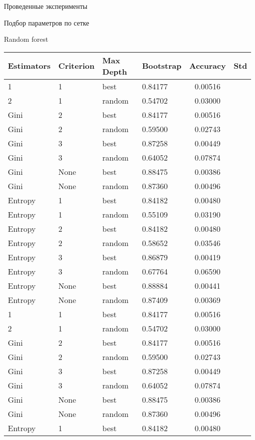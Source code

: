 \begin{section}{Проведенные эксперименты}
\begin{subsection}{Подбор параметров по сетке}
\begin{subsubsection}{Random forest}
  \begin{table}[H]
  \centering
  {\begin{tabular}{|l|l|l|l|c|c|}
  \hline
  \textbf{Estimators} & \textbf{Criterion} & \textbf{Max Depth} & \textbf{Bootstrap} & \textbf{Accuracy} & \textbf{Std} \\
  \hline
  1 & 1  & best & 0.84177 & 0.00516 \\
  \hline
  2 & 1  & random &  0.54702 & 0.03000 \\
  \hline
  Gini & 2  & best & 0.84177 & 0.00516 \\
  \hline
  Gini &  2 & random  & 0.59500 & 0.02743 \\
  \hline
  Gini & 3  & best & 0.87258 & 0.00449 \\
  \hline
  Gini & 3  & random & 0.64052 & 0.07874 \\
  \hline
  Gini & None  & best & 0.88475 & 0.00386 \\
  \hline
  Gini &  None & random  & 0.87360 & 0.00496 \\
  \hline
  Entropy & 1  & best & 0.84182 & 0.00480 \\
  \hline
  Entropy & 1  & random & 0.55109 & 0.03190 \\
  \hline
  Entropy  & 2  & best & 0.84182 & 0.00480 \\
  \hline
  Entropy  &  2 & random  & 0.58652 & 0.03546 \\
  \hline
  Entropy  & 3  & best &  0.86879 & 0.00419 \\
  \hline
  Entropy  & 3  & random & 0.67764 & 0.06590 \\
  \hline
  Entropy & None  & best & 0.88884 & 0.00441 \\
  \hline
  Entropy &  None & random  & 0.87409 & 0.00369 \\
  \hline
    1 & 1  & best & 0.84177 & 0.00516 \\
  \hline
  2 & 1  & random &  0.54702 & 0.03000 \\
  \hline
  Gini & 2  & best & 0.84177 & 0.00516 \\
  \hline
  Gini &  2 & random  & 0.59500 & 0.02743 \\
  \hline
  Gini & 3  & best & 0.87258 & 0.00449 \\
  \hline
  Gini & 3  & random & 0.64052 & 0.07874 \\
  \hline
  Gini & None  & best & 0.88475 & 0.00386 \\
  \hline
  Gini &  None & random  & 0.87360 & 0.00496 \\
  \hline
  Entropy & 1  & best & 0.84182 & 0.00480 \\

\end{tabular}}
\end{table}
\end{subsubsection}
\end{subsection}
\end{section}

